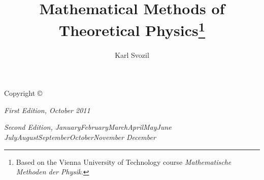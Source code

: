 \documentclass[xcolor=pdftex,dvipsnames,table]{tufte-book}
\title{Mathematical Methods of Theoretical Physics\thanks{Based on the Vienna University of Technology course {\em Mathematische Methoden der Physik}.}}
\author[Karl Svozil]{Karl Svozil}
\newcommand{\monthyear}{%
  \ifcase\month\or January\or February\or March\or April\or May\or June\or
  July\or August\or September\or October\or November\or
  December\fi\space\number\year
}
\begin{document}
\frontmatter


\newpage\thispagestyle{empty}


\maketitle


\newpage
\begin{fullwidth}
 \vfill
\thispagestyle{empty}
\setlength{\parindent}{0pt}
\setlength{\parskip}{\baselineskip}
Copyright \copyright\ \the\year\ \thanklessauthor

\par{}


\par\textit{First Edition, October 2011}
\par\textit{Second Edition, \monthyear}
\end{fullwidth}

\tableofcontents

\listoffigures

\listoftables





\cleardoublepage




\mainmatter
\end{document}
